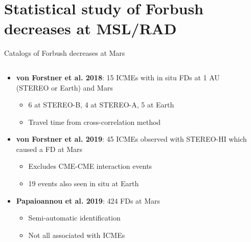 \documentclass[10pt,aspectratio=169,usenames,dvipsnames]{beamer}
\begin{document}
\section{Statistical study of Forbush decreases at MSL/RAD}

\begin{frame}{Catalogs of Forbush decreases at Mars}
    \begin{columns}
    	\begin{column}{0.55\textwidth}
    		\begin{itemize}
                \item<1-> \textbf{von Forstner et al. 2018}: 15 ICMEs with in situ FDs at 1 AU (STEREO or Earth) and Mars
                    \begin{itemize}
                        \item 6 at STEREO-B, 4 at STEREO-A, 5 at Earth
                        \item Travel time from cross-correlation method
                    \end{itemize}
    			\item<2-> \textbf{von Forstner et al. 2019}: 45 ICMEs observed with STEREO-HI which caused a FD at Mars
    				\begin{itemize}
    					\item Excludes CME-CME interaction events
    					\item 19 events also seen in situ at Earth
    				\end{itemize}
    			\item<3-> \textbf{Papaioannou et al. 2019}: 424 FDs at Mars
    				\begin{itemize}
    					\item Semi-automatic identification
    					\item Not all associated with ICMEs
    				\end{itemize}
    		\end{itemize}
    	\end{column}
    	\begin{column}{0.35\textwidth}
            \centering
\end{column}
\end{columns}
\end{frame}
\end{document}

